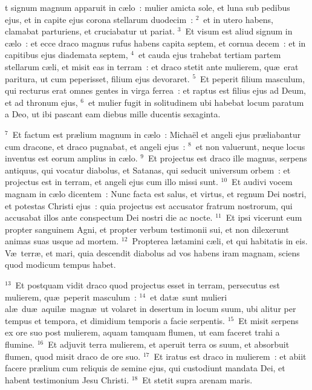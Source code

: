 \bchapter
{}t signum magnum apparuit in c\ae lo~: mulier amicta sole, et luna sub pedibus ejus, et in capite ejus corona stellarum duodecim~:
${}^{2}$~et in utero habens, clamabat parturiens, et cruciabatur ut pariat.
${}^{3}$~Et visum est aliud signum in c\ae lo~: et ecce draco magnus rufus habens capita septem, et cornua decem~: et in capitibus ejus diademata septem,
${}^{4}$~et cauda ejus trahebat tertiam partem stellarum c\ae li, et misit eas in terram~: et draco stetit ante mulierem, qu\ae\ erat paritura, ut cum peperisset, filium ejus devoraret.
${}^{5}$~Et peperit filium masculum, qui recturus erat omnes gentes in virga ferrea~: et raptus est filius ejus ad Deum, et ad thronum ejus,
${}^{6}$~et mulier fugit in solitudinem ubi habebat locum paratum a Deo, ut ibi pascant eam diebus mille ducentis sexaginta.


${}^{7}$~Et factum est pr\ae lium magnum in c\ae lo~: Micha\"el et angeli ejus pr\ae liabantur cum dracone, et draco pugnabat, et angeli ejus~:
${}^{8}$~et non valuerunt, neque locus inventus est eorum amplius in c\ae lo.
${}^{9}$~Et projectus est draco ille magnus, serpens antiquus, qui vocatur diabolus, et Satanas, qui seducit universum orbem~: et projectus est in terram, et angeli ejus cum illo missi sunt.
${}^{10}$~Et audivi vocem magnam in c\ae lo dicentem~: Nunc facta est salus, et virtus, et regnum Dei nostri, et potestas Christi ejus~: quia projectus est accusator fratrum nostrorum, qui accusabat illos ante conspectum Dei nostri die ac nocte.
${}^{11}$~Et ipsi vicerunt eum propter sanguinem Agni, et propter verbum testimonii sui, et non dilexerunt animas suas usque ad mortem.
${}^{12}$~Propterea l\ae tamini c\ae li, et qui habitatis in eis. V\ae\ terr\ae , et mari, quia descendit diabolus ad vos habens iram magnam, sciens quod modicum tempus habet.


${}^{13}$~Et postquam vidit draco quod projectus esset in terram, persecutus est mulierem, qu\ae\ peperit masculum~:
${}^{14}$~et dat\ae\ sunt mulieri al\ae\ du\ae\ aquil\ae\ magn\ae\ ut volaret in desertum in locum suum, ubi alitur per tempus et tempora, et dimidium temporis a facie serpentis.
${}^{15}$~Et misit serpens ex ore suo post mulierem, aquam tamquam flumen, ut eam faceret trahi a flumine.
${}^{16}$~Et adjuvit terra mulierem, et aperuit terra os suum, et absorbuit flumen, quod misit draco de ore suo.
${}^{17}$~Et iratus est draco in mulierem~: et abiit facere pr\ae lium cum reliquis de semine ejus, qui custodiunt mandata Dei, et habent testimonium Jesu Christi.
${}^{18}$~Et stetit supra arenam maris.


